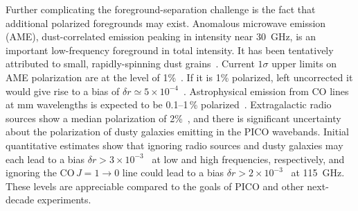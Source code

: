 \documentclass[PICOReport.tex]{subfiles}
\begin{document}

Further complicating the foreground-separation challenge is the fact that additional polarized foregrounds may exist.  
Anomalous microwave emission (AME), dust-correlated emission peaking in intensity near 30~GHz, is an important low-frequency foreground in total intensity. 
It has been tentatively attributed to small, rapidly-spinning dust grains~\citep{dickinson2018}. Current $1\sigma$ upper limits on AME polarization are at the level of 1\%~\citep{dickinson2018}. If it is 1\% 
polarized, left uncorrected it would give rise to a bias of $\delta r \simeq 5\times10^{-4}$~\citep{remazeilles2016}.  Astrophysical emission from CO lines at mm wavelengths is expected to be 0.1--1\,\% polarized~\citep{greeves1999, puglisi2017}.  Extragalactic radio sources show a median polarization of 2\%~\citep{Bonavera2018, puglisi2018_polsource, trombetti2018_fracpol}, and there is significant uncertainty about the polarization of dusty galaxies emitting in the PICO wavebands. Initial quantitative estimates show that ignoring radio sources and dusty galaxies may each lead to a bias $\delta r > 3\times10^{-3}$~\citep{toffolatti2012,Bonavera2018,remazeilles2018}  %
at low and high frequencies, respectively, and ignoring the CO\,$J=1\rightarrow0$ line could lead to a bias $\delta r > 2\times10^{-3}$~\citep{puglisi2017} at 115~GHz. %
These levels are appreciable compared to the goals of PICO and other next-decade experiments. 
\end{document}
